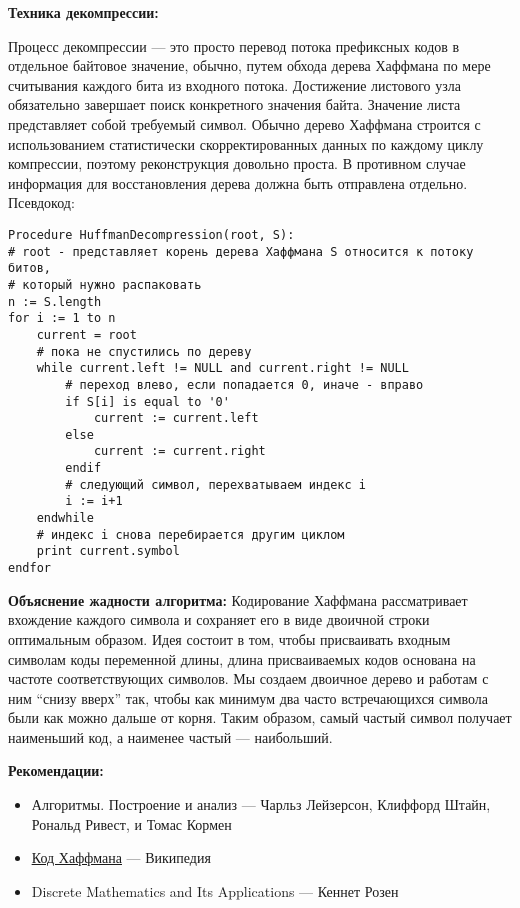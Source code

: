 \vspace{\baselineskip}
{\bfseries Техника декомпрессии:}

\vspace{\baselineskip}
Процесс декомпрессии --- это просто перевод потока префиксных кодов в отдельное байтовое значение, обычно, путем обхода дерева Хаффмана по мере считывания каждого бита из входного потока. Достижение листового узла обязательно завершает поиск конкретного значения байта. Значение листа представляет собой требуемый символ. Обычно дерево Хаффмана строится с использованием статистически скорректированных данных по каждому циклу компрессии, поэтому реконструкция довольно проста. В противном случае информация для восстановления дерева должна быть отправлена отдельно. Псевдокод:

\vspace{\baselineskip}
\begin{tcolorbox}
\begin{verbatim}
Procedure HuffmanDecompression(root, S): 
# root - представляет корень дерева Хаффмана S относится к потоку битов, 
# который нужно распаковать 
n := S.length 
for i := 1 to n
	current = root
	# пока не спустились по дереву
	while current.left != NULL and current.right != NULL
		# переход влево, если попадается 0, иначе - вправо
		if S[i] is equal to '0'
			current := current.left
		else
			current := current.right
		endif
		# следующий символ, перехватываем индекс i
		i := i+1
	endwhile
	# индекс i снова перебирается другим циклом
	print current.symbol
endfor
\end{verbatim}
\end{tcolorbox}

\vspace{\baselineskip}
{\bfseries Объяснение жадности алгоритма:}
Кодирование Хаффмана рассматривает вхождение каждого символа и сохраняет его в виде двоичной строки оптимальным образом. Идея состоит в том, чтобы присваивать входным символам коды переменной длины, длина присваиваемых кодов основана на частоте соответствующих символов. Мы создаем двоичное дерево и работам с ним “снизу вверх” так, чтобы как минимум два часто встречающихся символа были как можно дальше от корня. Таким образом, самый частый символ получает наименьший код, а наименее частый --- наибольший.

\vspace{\baselineskip}
{\bfseries Рекомендации:}

\begin{itemize}
  \item Алгоритмы. Построение и анализ --- Чарльз Лейзерсон, Клиффорд Штайн, Рональд Ривест, и Томас Кормен
  \item \href{https://en.wikipedia.org/wiki/Huffman_coding}{\underline{Код Хаффмана}} --- Википедия 
  \item Discrete Mathematics and Its Applications --- Кеннет Розен
\end{itemize}

